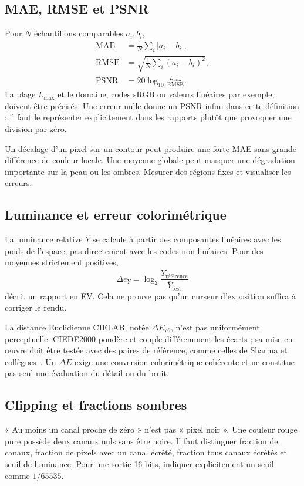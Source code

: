 \subsection{MAE, RMSE et PSNR}
Pour $N$ échantillons comparables $a_i,b_i$,
\begin{align}
\mathrm{MAE}&=\frac1N\sum_i|a_i-b_i|,\\
\mathrm{RMSE}&=\sqrt{\frac1N\sum_i(a_i-b_i)^2},\\
\mathrm{PSNR}&=20\log_{10}\frac{L_{\max}}{\mathrm{RMSE}}.
\end{align}
La plage $L_{\max}$ et le domaine, codes sRGB ou
valeurs linéaires par exemple, doivent être précisés.
Une erreur nulle donne un PSNR infini dans cette
définition ; il faut le représenter explicitement
dans les rapports plutôt que provoquer une division
par zéro.

Un décalage d'un pixel sur un contour peut produire
une forte MAE sans grande différence de couleur
locale. Une moyenne globale peut masquer une
dégradation importante sur la peau ou les ombres.
Mesurer des régions fixes et visualiser les erreurs.

\subsection{Luminance et erreur colorimétrique}
La luminance relative $Y$ se calcule à partir des
composantes linéaires avec les poids de l'espace,
pas directement avec les codes non linéaires.
Pour des moyennes strictement positives,
\begin{equation}
\Delta e_Y=\log_2\frac{\overline Y_{\text{référence}}}
{\overline Y_{\text{test}}}
\end{equation}
décrit un rapport en EV. Cela ne prouve pas qu'un
curseur d'exposition suffira à corriger le rendu.

La distance Euclidienne CIELAB, notée $\Delta E_{76}$,
n'est pas uniformément perceptuelle. CIEDE2000
pondère et couple différemment les écarts ; sa
mise en œuvre doit être testée avec des paires
de référence, comme celles de Sharma et collègues~\cite{ciedeimages}.
Un $\Delta E$ exige une conversion colorimétrique
cohérente et ne constitue pas seul une évaluation
du détail ou du bruit.

\subsection{Clipping et fractions sombres}
« Au moins un canal proche de zéro » n'est pas
« pixel noir ». Une couleur rouge pure possède
deux canaux nuls sans être noire. Il faut distinguer
fraction de canaux, fraction de pixels avec un
canal écrêté, fraction tous canaux écrêtés et
seuil de luminance. Pour une sortie 16 bits,
indiquer explicitement un seuil comme $1/65535$.

